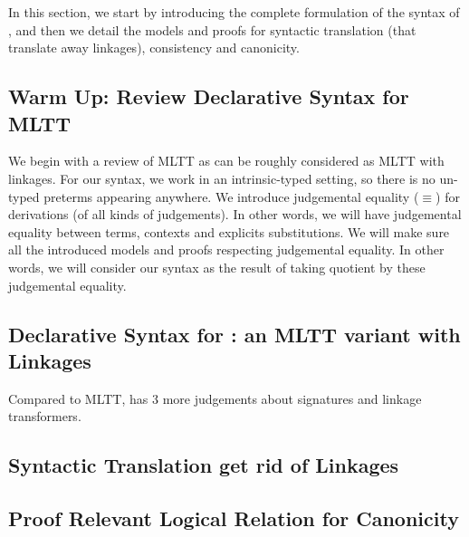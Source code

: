 In this section, we start by introducing the complete formulation of the syntax of \TT, 
and then we detail the models and proofs for syntactic translation (that translate away linkages), 
consistency and canonicity. 

\subsection{Warm Up: Review Declarative Syntax for MLTT}
We begin with a review of MLTT as \TT can be roughly considered as MLTT with linkages.
For our syntax, we work in an intrinsic-typed setting, so there is no un-typed preterms appearing anywhere. We introduce judgemental equality ($\equiv$)
for derivations (of all kinds of judgements). In other words, we will have judgemental equality between terms, 
contexts and explicits substitutions. 
We will make sure all the introduced models and proofs respecting judgemental equality. In other words, we will consider our syntax as the result of taking quotient by these judgemental equality.



\subsection{Declarative Syntax for \TT : an MLTT variant with Linkages}
Compared to MLTT, \TT has 3 more judgements about signatures and linkage transformers.








\subsection{Syntactic Translation get rid of Linkages}




% 


\subsection{Proof Relevant Logical Relation for Canonicity}

